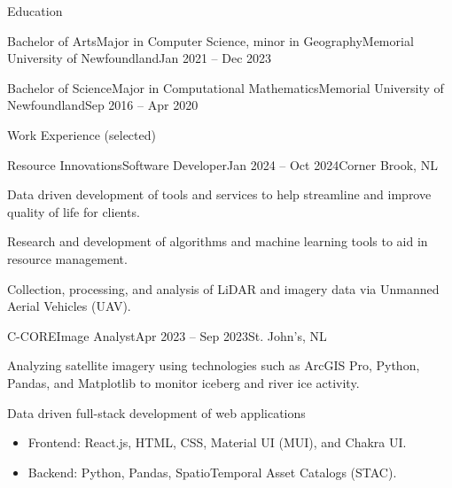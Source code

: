 \documentclass[]{Keenan-Nicholson-Resume}
\begin{document}
\resumeheader
{}
{}
{}
{}
{}

\begin{section}{Education}
    \begin{subsection}{Bachelor of Arts}{Major in Computer Science, minor in Geography}{Memorial University of Newfoundland}{Jan 2021 -- Dec 2023}
    \end{subsection}
    \begin{subsection}{Bachelor of Science}{Major in Computational Mathematics}{Memorial University of Newfoundland}{Sep 2016 -- Apr 2020}
    \end{subsection}
\end{section}

\begin{section}{Work Experience (selected)}
    \begin{subsection}{Resource Innovations}{Software Developer}{Jan 2024 -- Oct 2024}{Corner Brook, NL}
        \item Data driven development of tools and services to help streamline and improve quality of life for clients.
        \item Research and development of algorithms and machine learning tools to aid in resource management.
        \item Collection, processing, and analysis of LiDAR and imagery data via Unmanned Aerial Vehicles (UAV).
    \end{subsection}
    \begin{subsection}{C-CORE}{Image Analyst}{Apr 2023 -- Sep 2023}{St. John's, NL}
        \item Analyzing satellite imagery using technologies such as ArcGIS Pro, Python, Pandas, and Matplotlib to \newline monitor iceberg and river ice activity.
        
        \item Data driven full-stack development of web applications
        \vspace{-4pt}
            \begin{itemize}[itemsep=-6.5pt]
                \item Frontend: React.js, HTML, CSS, Material UI (MUI), and Chakra UI.
                \item Backend: Python, Pandas, SpatioTemporal Asset Catalogs (STAC).
            \end{itemize}
        \vspace{1pt}
    \end{subsection}
\end{section}
\end{document}
